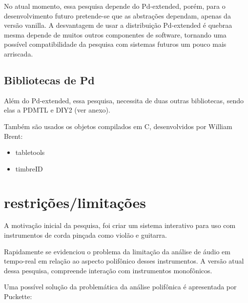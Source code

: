 \documentclass{ppgmus}
\begin{document}
No atual momento, essa pesquisa depende do Pd-extended, porém, para o desenvolvimento futuro pretende-se
que as abstrações dependam, apenas da versão vanilla. A desvantagem de usar a distribuição Pd-extended é quebraa mesma 
depende de muitos outros componentes de software, tornando uma possível compatibilidade da pesquisa com sistemas
futuros um pouco mais arriscada. 


\subsection{Bibliotecas de Pd}

Além do Pd-extended, essa pesquisa, necessita de duas outras bibliotecas, sendo elas a PDMTL e DIY2 (ver anexo).

Também são usados os objetos compilados em C, desenvolvidos por William Brent:

\begin{itemize}
 \item tabletools
 \item timbreID
\end{itemize}





\newpage


\section{restrições/limitações}


A motivação inicial da pesquisa, foi criar um sistema interativo
para uso com instrumentos de corda pinçada como violão e guitarra.

Rapidamente se evidenciou o problema da limitação da análise de áudio
em tempo-real em relação ao aspecto polifônico desses instrumentos.
A versão atual dessa pesquisa, compreende interação com instrumentos
monofônicos.

Uma possível solução da problemática da análise polifônica é apresentada
por Puckette:
\end{document}

